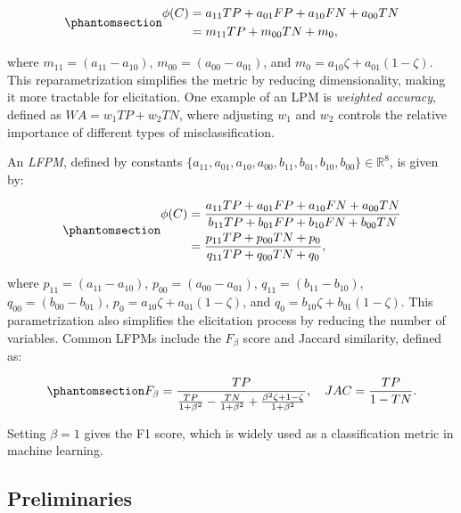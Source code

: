 \documentclass[
  letterpaper,
  numbers=noenddot,
  DIV=11]{scrreprt}
\theoremstyle{plain}
\theoremstyle{definition}
\theoremstyle{plain}
\theoremstyle{remark}
\begin{document}
\begin{equation}\phantomsection\label{eq-eqlpm}{\begin{aligned}
\phi(C) &= a_{11} TP + a_{01} FP + a_{10} FN + a_{00} TN\\
&= m_{11} TP + m_{00} TN + m_{0},
\end{aligned}}\end{equation}

where \(m_{11} = (a_{11} - a_{10})\), \(m_{00} = (a_{00} - a_{01})\),
and \(m_{0} = a_{10} \zeta + a_{01} (1 - \zeta)\). This
reparametrization simplifies the metric by reducing dimensionality,
making it more tractable for elicitation. One example of an LPM is
\emph{weighted accuracy}, defined as \(WA = w_1TP + w_2TN\), where
adjusting \(w_1\) and \(w_2\) controls the relative importance of
different types of misclassification.

An \emph{LFPM}, defined by constants
\(\{a_{11}, a_{01}, a_{10}, a_{00}, b_{11}, b_{01}, b_{10}, b_{00}\} \in \mathbb{R}^{8}\),
is given by:

\begin{equation}\phantomsection\label{eq-eqlfpm}{\begin{aligned}
\phi(C) &= \frac{a_{11} TP + a_{01} FP + a_{10} FN + a_{00} TN}{b_{11} TP + b_{01} FP + b_{10} FN + b_{00} TN}\\
&= \frac{p_{11} TP + p_{00} TN + p_{0}}{q_{11} TP + q_{00} TN + q_{0}},
\end{aligned}}\end{equation}

where \(p_{11} = (a_{11} - a_{10})\), \(p_{00} = (a_{00} - a_{01})\),
\(q_{11} = (b_{11} - b_{10})\), \(q_{00} = (b_{00} - b_{01})\),
\(p_{0} = a_{10} \zeta + a_{01} (1 - \zeta)\), and
\(q_{0} = b_{10} \zeta + b_{01} (1 - \zeta)\). This parametrization also
simplifies the elicitation process by reducing the number of variables.
Common LFPMs include the \(F_\beta\) score and Jaccard similarity,
defined as:

\begin{equation}\phantomsection\label{eq-lfpm_metrics}{F_{\beta} = \frac{TP}{\frac{TP}{1+\beta^{2}} - \frac{TN}{1+\beta^{2}} + \frac{\beta^{2} \zeta + 1 - \zeta}{1+\beta^{2}}}, \quad JAC = \frac{TP}{1 - TN}.}\end{equation}

Setting \(\beta = 1\) gives the F1 score, which is widely used as a
classification metric in machine learning.

\subsection{Preliminaries}\label{sec-me-preliminaries}
\end{document}
